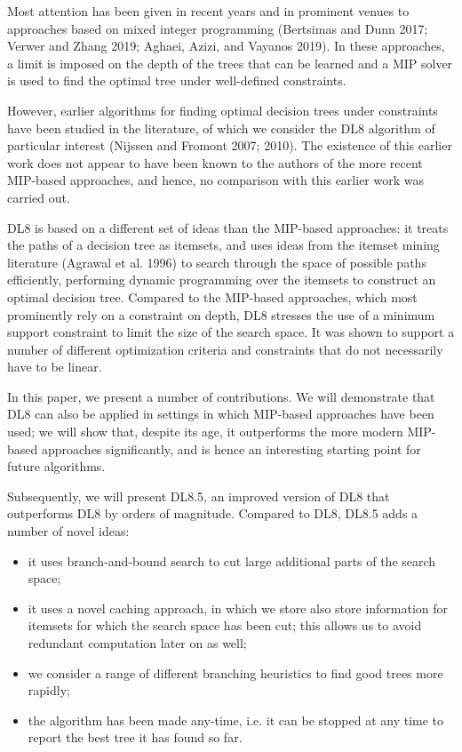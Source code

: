 Most attention has been given in recent years and in prominent venues to approaches based on mixed integer programming (Bertsimas and Dunn 2017; Verwer and Zhang 2019; Aghaei, Azizi, and Vayanos 2019). In these approaches, a limit is imposed on the depth of the trees that can be learned and a MIP solver is used to find the optimal tree under well-defined constraints.

However, earlier algorithms for finding optimal decision trees under constraints have been studied in the literature, of which we consider the DL8 algorithm of particular interest (Nijssen and Fromont 2007; 2010). The existence of this earlier work does not appear to have been known to the authors of the more recent MIP-based approaches, and hence, no comparison with this earlier work was carried out.

DL8 is based on a different set of ideas than the MIP-based approaches: it treats the paths of a decision tree as itemsets, and uses ideas from the itemset mining literature (Agrawal et al. 1996) to search through the space of possible paths efficiently, performing dynamic programming over the itemsets to construct an optimal decision tree. Compared to the MIP-based approaches, which most prominently rely on a constraint on depth, DL8 stresses the use of a minimum support constraint to limit the size of the search space. It was shown to support a number of different optimization criteria and constraints that do not necessarily have to be linear.

In this paper, we present a number of contributions. We will demonstrate that DL8 can also be applied in settings in which MIP-based approaches have been used; we will show that, despite its age, it outperforms the more modern MIP-based approaches significantly, and is hence an interesting starting point for future algorithms.

Subsequently, we will present DL8.5, an improved version of DL8 that outperforms DL8 by orders of magnitude. Compared to DL8, DL8.5 adds a number of novel ideas:

\begin{itemize}
	\item it uses branch-and-bound search to cut large additional parts of the search space;
	\item it uses a novel caching approach, in which we store also store information for itemsets for which the search space has been cut; this allows us to avoid redundant computation later on as well;
	\item we consider a range of different branching heuristics to find good trees more rapidly;
	\item the algorithm has been made any-time, i.e. it can be stopped at any time to report the best tree it has found so far.
\end{itemize}

